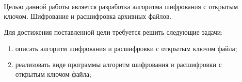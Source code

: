 %
%
%


Целью данной работы является разработка алгоритма шифрования с открытым ключом. Шифрование и расшифровка архивных файлов.


Для достижения поставленной цели требуется решить следующие задачи:
\begin{enumerate}[label={\arabic*)}]
	\item описать алгоритм шифрования и расшифровки с открытым ключом файла;
	\item реализовать виде программы алгоритм шифрования и расшифровки с открытым ключом файла;
\end{enumerate}


\clearpage

